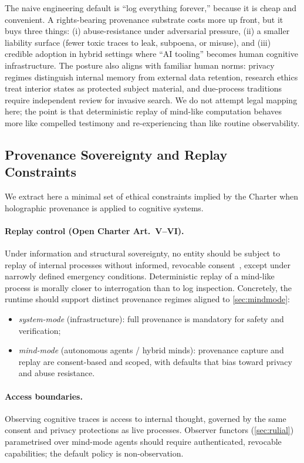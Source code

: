 \documentclass{aion}
\begin{document}
The naive engineering default is ``log everything forever,'' because it is cheap and convenient.
A rights-bearing provenance substrate costs more up front, but it buys three things: (i) abuse-resistance under adversarial pressure, (ii) a smaller liability surface (fewer toxic traces to leak, subpoena, or misuse), and (iii) credible adoption in hybrid settings where ``AI tooling'' becomes human cognitive infrastructure.
The posture also aligns with familiar human norms: privacy regimes distinguish internal memory from external data retention, research ethics treat interior states as protected subject material, and due-process traditions require independent review for invasive search.
We do not attempt legal mapping here; the point is that deterministic replay of mind-like computation behaves more like compelled testimony and re-experiencing than like routine observability.

\subsection{Provenance Sovereignty and Replay Constraints}

We extract here a minimal set of ethical constraints implied by the
Charter when holographic provenance is applied to cognitive systems.

\paragraph{Replay control (Open Charter Art.~V--VI).}
Under information and structural sovereignty, no entity should be
subject to replay of internal processes without informed, revocable
consent~\cite{ross_open_charter_v6_1}, except under narrowly defined emergency
conditions.
Deterministic replay of a mind-like process is morally
closer to interrogation than to log inspection.
Concretely, the runtime should support distinct provenance regimes aligned to
\cref{sec:mindmode}:
\begin{itemize}[leftmargin=*]
  \item \emph{system-mode} (infrastructure): full provenance is
    mandatory for safety and verification;
  \item \emph{mind-mode} (autonomous agents / hybrid minds): provenance capture and
    replay are consent-based and scoped, with defaults that bias toward
    privacy and abuse resistance.
\end{itemize}

\paragraph{Access boundaries.}
Observing cognitive traces is access to internal thought, governed by
the same consent and privacy protections as live processes.
Observer functors (\cref{sec:rulial}) parametrised over mind-mode agents
should require authenticated, revocable capabilities; the default
policy is non-observation.
\end{document}
